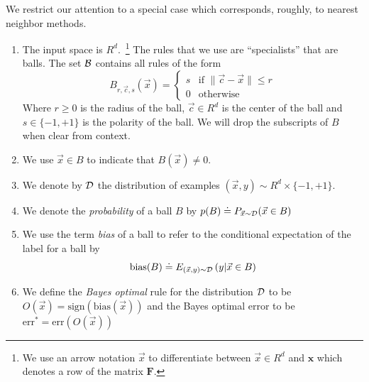 \documentclass{article}
\newcommand{\err}{\mbox{err}}
\newcommand{\D}{{\cal D}}
\newcommand{\B}{{\cal B}}
\newcommand{\x}{\vec{x}}
\newcommand{\cc}{\vec{c}}
\renewcommand{\SS}{{\cal S}} %
\newcommand{\CC}{{\cal C}}  %
\newcommand{\vF}{\mathbf{F}}
\newcommand{\vx}{\mathbf{x}}
\newcommand{\bias}{\text{bias}}
\newcommand{\ebias}{\widehat{\text{bias}}}
\newcommand{\eD}{\hat{\D}}
\newcommand{\ep}{\hat{p}}
\newcommand{\sign}{\text{sign}}
\begin{document}
We restrict our attention to a special case which corresponds,
roughly, to nearest neighbor methods.
\begin{enumerate}
  \item The input space is $R^d$.~\footnote{We use an arrow notation $\x$ to
    differentiate between $\x \in R^d$ and $\vx$ which denotes a row
    of the matrix $\vF$.}
    The rules that we use are ``specialists'' that are balls. The set
    $\B$ contains all rules of the form 
    \[
    B_{r,\cc,s}(\x) =
    \begin{cases}
      s & \text{if } \| \cc- \x \| \leq r \\
    0 & \text{otherwise }
    \end{cases}
    \]
    Where $r \geq 0$ is the radius of the ball, $\cc \in R^d$ is the
    center of the ball and $s \in \{-1,+1\}$ is the polarity of the ball.
    We will drop the subscripts of $B$ when clear from context.
  \item
    We use $\x \in B$ to indicate that $B(\x) \neq 0$.
  \item
    We denote by $\D$ the distribution of examples $(\x,y) \sim R^d
    \times \{-1,+1\}$.
  \item
    We denote the {\em probability} of a ball $B$ by $p(B) \doteq
    P_{\x \sim \D}(\x \in B)$
  \item
    We use the term {\em bias} of a ball to refer to the conditional
    expectation of the label for a ball by
    $$
    \bias(B) \doteq E_{(\x,y)\sim\D}\left( y|\x \in B \right)
    $$

  \item
    We define the {\em Bayes optimal} rule for the distribution $\D$
    to be $O(\x) = \sign(\bias(\x))$ and the Bayes optimal error to
    be $\err^* = \err(O(\x))$
\end{enumerate}

\newcommand{\edge}{\gamma}
\newcommand{\SepsGamSig}{\SS_{\epsilon,\edge}^{s}}
\newcommand{\SepsGam}{\SS_{\epsilon,\edge}}
\newcommand{\SepsGamMinusSig}{\SS_{\epsilon,\edge}^{-s}}
\newcommand{\ConstrepsGamSig}{\CC_{\epsilon,\edge}^{s}}
\newcommand{\ConstrepsGam}{\CC_{\epsilon,\edge}}
\newcommand{\ConstrepsGamMinusSig}{\CC_{\epsilon,\edge}^{-s}}
\end{document}
